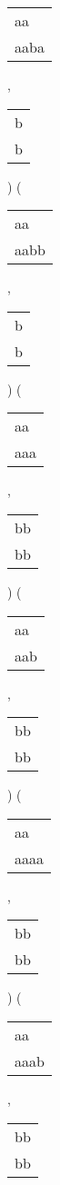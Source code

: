\begin{description}
\begin{tabular}{|l|}
aa\ \  \\
aaba \\
\hline
\end{tabular} 
 , 
\begin{tabular}{|l|} \hline
b \\
b \\
\hline
\end{tabular} 
) 
 ( 
\begin{tabular}{|l|} \hline
aa\ \  \\
aabb \\
\hline
\end{tabular} 
 , 
\begin{tabular}{|l|} \hline
b \\
b \\
\hline
\end{tabular} 
) 
 ( 
\begin{tabular}{|l|} \hline
aa\  \\
aaa \\
\hline
\end{tabular} 
 , 
\begin{tabular}{|l|} \hline
bb \\
bb \\
\hline
\end{tabular} 
) 
 ( 
\begin{tabular}{|l|} \hline
aa\  \\
aab \\
\hline
\end{tabular} 
 , 
\begin{tabular}{|l|} \hline
bb \\
bb \\
\hline
\end{tabular} 
) 
 ( 
\begin{tabular}{|l|} \hline
aa\ \  \\
aaaa \\
\hline
\end{tabular} 
 , 
\begin{tabular}{|l|} \hline
bb \\
bb \\
\hline
\end{tabular} 
) 
 ( 
\begin{tabular}{|l|} \hline
aa\ \  \\
aaab \\
\hline
\end{tabular} 
 , 
\begin{tabular}{|l|} \hline
bb \\
bb \\

\end{tabular}
\end{description}
